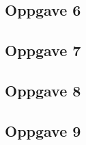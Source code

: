 \documentclass[norsk,a4,12pt,fleqn]{extarticle}
\begin{document}
\subsection*{Oppgave 6}

\newpage
\subsection*{Oppgave 7}

\newpage
\subsection*{Oppgave 8} 

\newpage
\subsection*{Oppgave 9} 

\end{document}

